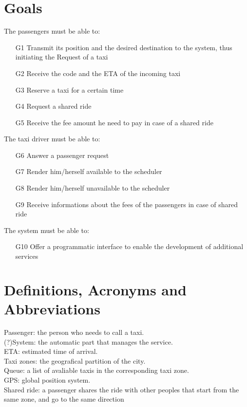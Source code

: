 \documentclass[a4paper,11pt]{report}
\begin{document}
\section{Goals}
The passengers must be able to:
\begin{itemize}
  \item [G1] Transmit its position and the desired destination to the system, thus initiating the Request of a taxi
  \item [G2] Receive the code and the ETA of the incoming taxi
  \item [G3] Reserve a taxi for a certain time
  \item [G4] Request a shared ride
  \item [G5] Receive the fee amount he need to pay in case of a shared ride
\end{itemize}
The taxi driver must be able to:
\begin{itemize}
  \item [G6] Answer a passenger request
  \item [G7] Render him/herself available to the scheduler
  \item [G8] Render him/herself unavailable to the scheduler
  \item [G9] Receive informations about the fees of the passengers in case of shared ride
\end{itemize}
The system must be able to:
\begin{itemize}
  \item [G10] Offer a programmatic interface to enable the development of additional services\\
\end{itemize}
\section{Definitions, Acronyms and Abbreviations}
Passenger: the person who needs to call a taxi.\\
(?)System: the automatic part that manages the service.\\
ETA: estimated time of arrival.\\
Taxi zones: the geografical partition of the city.\\
Queue: a list of avaliable taxis in the corresponding taxi zone.\\
GPS: global position system.\\
Shared ride: a passenger shares the ride with other peoples that start from the same zone, and go to the same direction\\
\end{document}
